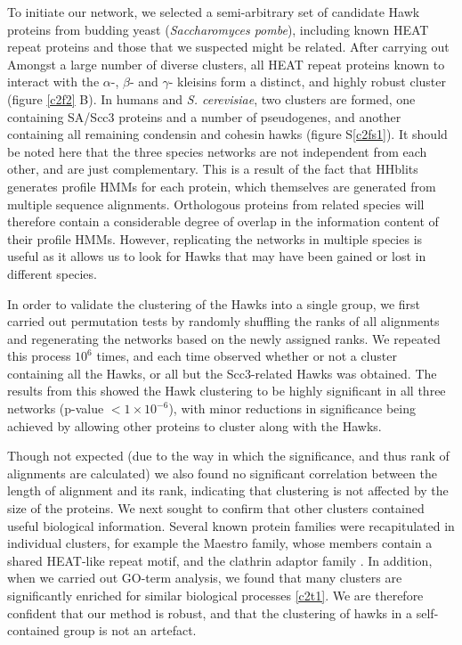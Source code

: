 \documentclass[a4paper,11pt,twoside,openright]{scrbook}
\begin{document}
To initiate our network, we selected a semi-arbitrary set of candidate Hawk proteins from budding yeast (\textit{Saccharomyces pombe}), including known HEAT repeat proteins and those that we suspected might be related. After carrying out Amongst a large number of diverse clusters, all HEAT repeat proteins known to interact with the $\alpha$-, $\beta$- and $\gamma$- kleisins \cite{Nasmyth2009, Hirano2016} form a distinct, and highly robust cluster (figure \ref{c2f2} B). In humans and \textit{S. cerevisiae}, two clusters are formed, one containing SA/Scc3 proteins and a number of pseudogenes, and another containing all remaining condensin and cohesin hawks (figure S\ref{c2fs1}). It should be noted here that the three species networks are not independent from each other, and are just complementary. This is a result of the fact that HHblits generates profile HMMs for each protein, which themselves are generated from multiple sequence alignments. Orthologous proteins from related species will therefore contain a considerable degree of overlap in the information content of their profile HMMs. However, replicating the networks in multiple species is useful as it allows us to look for Hawks that may have been gained or lost in different species.

In order to validate the clustering of the Hawks into a single group, we first carried out permutation tests by randomly shuffling the ranks of all alignments and regenerating the networks based on the newly assigned ranks. We repeated this process $10^{6}$ times, and each time observed whether or not a cluster containing all the Hawks, or all but the Scc3-related Hawks was obtained. The results from this showed the Hawk clustering to be highly significant in all three networks (p-value $< 1 \times 10^{-6}$), with minor reductions in significance being achieved by allowing other proteins to cluster along with the Hawks.

Though not expected (due to the way in which the significance, and thus rank of alignments are calculated) we also found no significant correlation between the length of alignment and its rank, indicating that clustering is not affected by the size of the proteins. We next sought to confirm that other clusters contained useful biological information. Several known protein families were recapitulated in individual clusters, for example the Maestro family, whose members contain a shared HEAT-like repeat motif, and the clathrin adaptor family \cite{Smith2003a, McMahon2004}. In addition, when we carried out GO-term analysis, we found that many clusters are significantly enriched for similar biological processes \ref{c2t1}. We are therefore confident that our method is robust, and that the clustering of hawks in a self-contained group is not an artefact.
\end{document}
